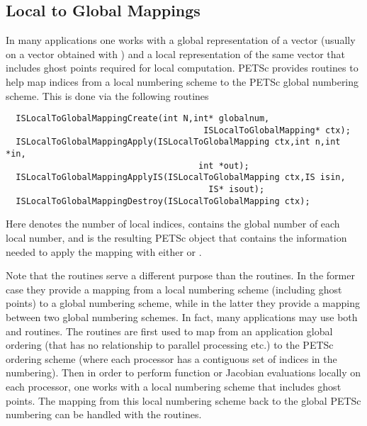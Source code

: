 \subsection{Local to Global Mappings}
\label{sec:islocaltoglobalmapping}
 

In many applications one works with a global representation of a vector
(usually on a vector obtained with ) 
and a local representation of the same vector that includes ghost points 
required for local computation.  
 
PETSc provides routines to help map indices from a local numbering scheme to 
the PETSc global numbering scheme. This is done via the following routines
\begin{verbatim}
  ISLocalToGlobalMappingCreate(int N,int* globalnum,
                                       ISLocalToGlobalMapping* ctx);
  ISLocalToGlobalMappingApply(ISLocalToGlobalMapping ctx,int n,int *in,
                                      int *out);
  ISLocalToGlobalMappingApplyIS(ISLocalToGlobalMapping ctx,IS isin,
                                        IS* isout);
  ISLocalToGlobalMappingDestroy(ISLocalToGlobalMapping ctx);
\end{verbatim}
 
 
Here  denotes the number of local indices,  contains the
global number of each local number, and  is the 
resulting PETSc object that contains the information needed to apply the mapping with 
either  or 
.  

Note that the  routines serve a different purpose
than the   routines. In the former case they provide a mapping 
from  a local numbering scheme (including ghost points) to a global numbering scheme,
while in the latter they provide a mapping between two global numbering schemes.
In fact, many applications may use both  and  routines.
The  routines are first used to map from an application global ordering 
(that has no relationship to parallel processing etc.) to the PETSc ordering scheme
(where each processor has a contiguous set of indices in the numbering). Then in order
to perform function or Jacobian evaluations locally on each processor, one works
with a local numbering scheme that includes ghost points.  The mapping from this local
numbering scheme back to the global PETSc numbering can be handled with the 
 routines.

